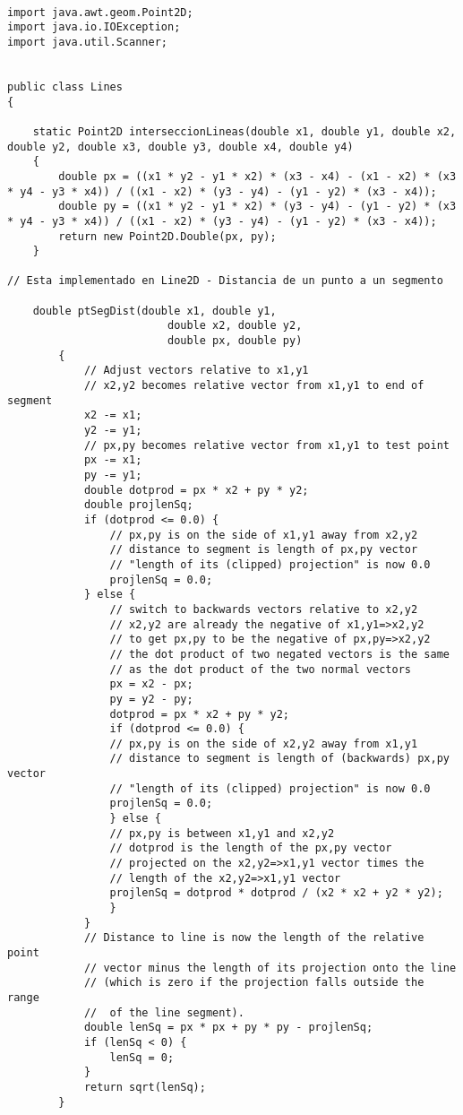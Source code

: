 \documentclass[a4paper, 11pt, oneside]{report}
\begin{document}
\begin{verbatim}

import java.awt.geom.Point2D;
import java.io.IOException;
import java.util.Scanner;


public class Lines
{
	
	static Point2D interseccionLineas(double x1, double y1, double x2, double y2, double x3, double y3, double x4, double y4)
	{
		double px = ((x1 * y2 - y1 * x2) * (x3 - x4) - (x1 - x2) * (x3 * y4 - y3 * x4)) / ((x1 - x2) * (y3 - y4) - (y1 - y2) * (x3 - x4));
		double py = ((x1 * y2 - y1 * x2) * (y3 - y4) - (y1 - y2) * (x3 * y4 - y3 * x4)) / ((x1 - x2) * (y3 - y4) - (y1 - y2) * (x3 - x4));
		return new Point2D.Double(px, py);
	}

// Esta implementado en Line2D - Distancia de un punto a un segmento

	double ptSegDist(double x1, double y1,
						 double x2, double y2,
						 double px, double py)
		{
			// Adjust vectors relative to x1,y1
			// x2,y2 becomes relative vector from x1,y1 to end of segment
			x2 -= x1;
			y2 -= y1;
			// px,py becomes relative vector from x1,y1 to test point
			px -= x1;
			py -= y1;
			double dotprod = px * x2 + py * y2;
			double projlenSq;
			if (dotprod <= 0.0) {
				// px,py is on the side of x1,y1 away from x2,y2
				// distance to segment is length of px,py vector
				// "length of its (clipped) projection" is now 0.0
				projlenSq = 0.0;
			} else {
				// switch to backwards vectors relative to x2,y2
				// x2,y2 are already the negative of x1,y1=>x2,y2
				// to get px,py to be the negative of px,py=>x2,y2
				// the dot product of two negated vectors is the same
				// as the dot product of the two normal vectors
				px = x2 - px;
				py = y2 - py;
				dotprod = px * x2 + py * y2;
				if (dotprod <= 0.0) {
				// px,py is on the side of x2,y2 away from x1,y1
				// distance to segment is length of (backwards) px,py vector
				// "length of its (clipped) projection" is now 0.0
				projlenSq = 0.0;
				} else {
				// px,py is between x1,y1 and x2,y2
				// dotprod is the length of the px,py vector
				// projected on the x2,y2=>x1,y1 vector times the
				// length of the x2,y2=>x1,y1 vector
				projlenSq = dotprod * dotprod / (x2 * x2 + y2 * y2);
				}
			}
			// Distance to line is now the length of the relative point
			// vector minus the length of its projection onto the line
			// (which is zero if the projection falls outside the range
			//  of the line segment).
			double lenSq = px * px + py * py - projlenSq;
			if (lenSq < 0) {
				lenSq = 0;
			}
			return sqrt(lenSq);
		}


\end{verbatim}
\end{document}
